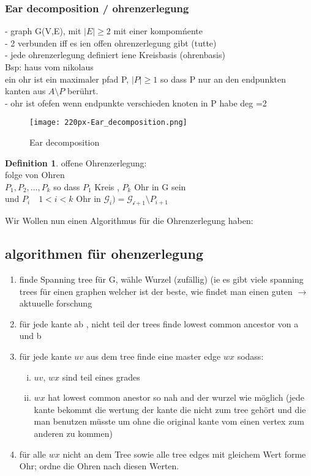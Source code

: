 \documentclass[a4paper]{article}
\theoremstyle{definition}
\newtheorem*{definition}{Definition}
\theoremstyle{remark}
\begin{document}
\subsubsection{Ear decomposition / ohrenzerlegung}
\label{ssub:ear_decomposition_ohrenzerlegung}

- graph G(V,E), mit $|E|\geq 2$ mit einer kompomńente  \\
- 2 verbunden iff es ien offen ohrenzerlegung gibt (tutte)\\
- jede ohrenzerlegung definiert iene Kreisbasis (ohrenbasis)\\
Bsp: haus vom nikolaus\\
ein ohr ist ein maximaler pfad P, $|P|\geq 1$ so dass P nur an den endpunkten kanten aus $A\setminus P$ berührt.\\
-  ohr ist ofefen wenn endpunkte verschieden  knoten in P habe deg =2\\
\begin{figure}[ht]
  \centering
  \texttt{[image: 220px-Ear\_decomposition.png]}
  \caption{Ear decomposition}
  \label{fig:220px-Ear_decomposition}
\end{figure}
\begin{definition}
  offene Ohrenzerlegung:\\
  folge von Ohren \\
  $P_1,P_2,\dots,P_k$ so dass $P_1$ Kreis , $P_k$ Ohr in G sein\\
und $P_i \quad 1<i<k$ Ohr in $ \mathcal{G}_i)= \mathcal{G_{i+1}}\setminus P_{i+1}$ \\


\end{definition}
Wir Wollen nun einen Algorithmus für die Ohrenzerlegung haben:
\subsection{algorithmen für ohenzerlegung}
\label{sub:algorithmen_fur_ohenzerlegung}
\begin{enumerate}
  \item finde Spanning tree für G, wähle Wurzel (zufällig) (ie es gibt viele spanning trees für einen graphen welcher ist der beste, wie findet man einen guten $\rightarrow $ aktuuelle forschung
    \item für jede kante ab , nicht teil der trees finde lowest common ancestor von a und b
    \item für jede kante $uv$ aus dem tree finde eine master edge $wx$ sodass: \begin{enumerate}[(i)]
	\item $uv$, $wx$ sind teil eines grades
	\item $wx$ hat lowest common anestor so nah and der wurzel wie möglich
	  (jede kante bekommt die wertung der kante die nicht zum tree gehört und die man benutzen müsste um ohne die original kante vom einen vertex zum anderen zu kommen)

    \end{enumerate} 
  \item für alle $wx$ nicht an dem Tree sowie alle tree edges mit gleichem Wert forme Ohr; ordne die Ohren nach diesen Werten.
\end{enumerate}
\end{document}
